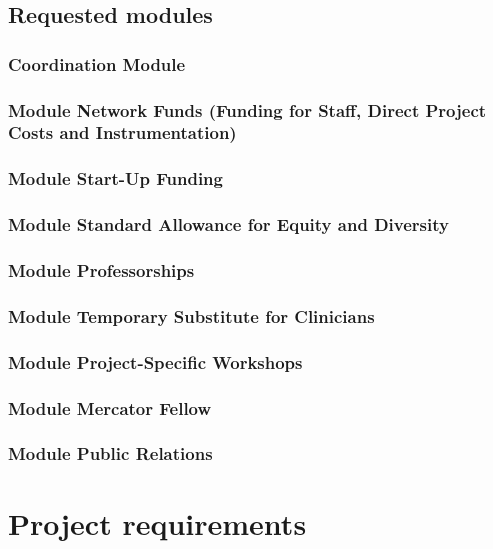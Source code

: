 \documentclass[english, 53.02]{proposal}
\begin{document}
\subsection{Requested modules}

\subsubsection{Coordination Module}

\subsubsection{Module Network Funds (Funding for Staff, Direct Project Costs and Instrumentation)}

\subsubsection{Module Start-Up Funding}

\subsubsection{Module Standard Allowance for Equity and Diversity}

\subsubsection{Module Professorships}

\subsubsection{Module Temporary Substitute for Clinicians}

\subsubsection{Module Project-Specific Workshops}

\subsubsection{Module Mercator Fellow}

\subsubsection{Module Public Relations}


\section{Project requirements}
\end{document}
